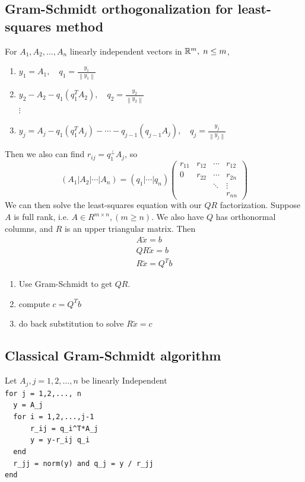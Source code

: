 \documentclass[11pt]{article}
\begin{document}
\subsection{Gram-Schmidt orthogonalization for least-squares method}
For $A_1, A_2, \dots, A_n$ linearly independent vectors in $\mathbb{R}^m, \; n \le m$,
\begin{enumerate}
    \item $y_1 = A_1, \quad q_1 = \frac{y_1}{\left\|y_1\right\|}$
    \item $y_2 - A_2 - q_1(q_1^TA_2), \quad q_2 = \frac{y_2}{\left\|y_2\right\|}$\\
    $\vdots$
    \item $y_j = A_j - q_1(q_1^TA_j) - \cdots - q_{j-1}(q_{j-1}A_j), \quad q_{j} = \frac{y_j}{\left\|y_j\right\|}$
\end{enumerate}
Then we also can find $r_{ij} = q_1^{\perp} A_j$, so
\[
    (A_1 | A_2 | \cdots | A_n) = (q_1 | \cdots | q_n)\begin{pmatrix}
        r_{11} & r_{12} & \cdots & r_{12}\\
        0 & r_{22} & \cdots & r_{2n}\\
        &&\ddots& \vdots\\
        &&&r_{nn}
    \end{pmatrix}
\]
We can then solve the least-squares equation with our $QR$ factorization. Suppose $A$ is full rank, i.e. $A \in R^{m\times n}, (m \ge n)$. 
We also have $Q$ has orthonormal columns, and $R$ is an upper triangular matrix. Then
\begin{align*}
    A\tilde{x} = b\\
    QR\tilde{x} = b\\
    R\tilde{x} = Q^Tb
\end{align*}

\begin{enumerate}
    \item Use Gram-Schmidt to get $QR$.
    \item compute $c = Q^Tb$
    \item do back substitution to solve $R\tilde{x} = c$
\end{enumerate}

\subsection{Classical Gram-Schmidt algorithm}
Let $A_j, j = 1,2,\dots,n$ be linearly Independent\\
\verb|for j = 1,2,..., n|\\
\verb|  y = A_j|\\
\verb|  for i = 1,2,...,j-1|\\
\verb|      r_ij = q_i^T*A_j|\\
\verb|      y = y-r_ij q_i|\\
\verb|  end|\\
\verb|  r_jj = norm(y) and q_j = y / r_jj|\\
\verb|end|
\end{document}
